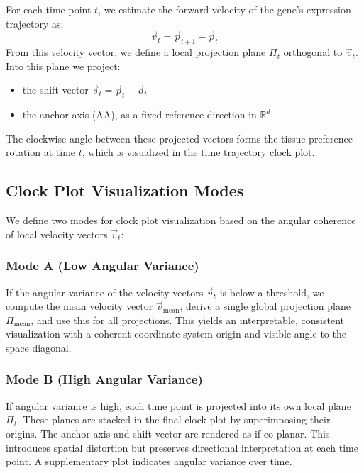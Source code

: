         For each time point \( t \), we estimate the forward velocity of the gene's expression trajectory as:
        \[
            \vec{v}_t = \vec{p}_{t+1} - \vec{p}_t
        \]
        From this velocity vector, we define a local projection plane \( \Pi_t \) orthogonal to \( \vec{v}_t \). Into this plane we project:

        \begin{itemize}
            \item the shift vector \( \vec{s}_t = \vec{p}_t - \vec{o}_t \)
            \item the anchor axis (AA), as a fixed reference direction in \( \mathbb{R}^d \)
        \end{itemize}

        The clockwise angle between these projected vectors forms the tissue preference rotation at time \( t \), which is visualized in the time trajectory clock plot.

    \subsection{Clock Plot Visualization Modes}

        We define two modes for clock plot visualization based on the angular coherence of local velocity vectors \( \vec{v}_t \):

        \subsubsection*{Mode A (Low Angular Variance)}

            If the angular variance of the velocity vectors \( \vec{v}_t \) is below a threshold, we compute the mean velocity vector \( \vec{v}_{\text{mean}} \), derive a single global projection plane \( \Pi_{\text{mean}} \), and use this for all projections. This yields an interpretable, consistent visualization with a coherent coordinate system origin and visible angle to the space diagonal.

        \subsubsection*{Mode B (High Angular Variance)}

            If angular variance is high, each time point is projected into its own local plane \( \Pi_t \). These planes are stacked in the final clock plot by superimposing their origins. The anchor axis and shift vector are rendered as if co-planar. This introduces spatial distortion but preserves directional interpretation at each time point. A supplementary plot indicates angular variance over time.

